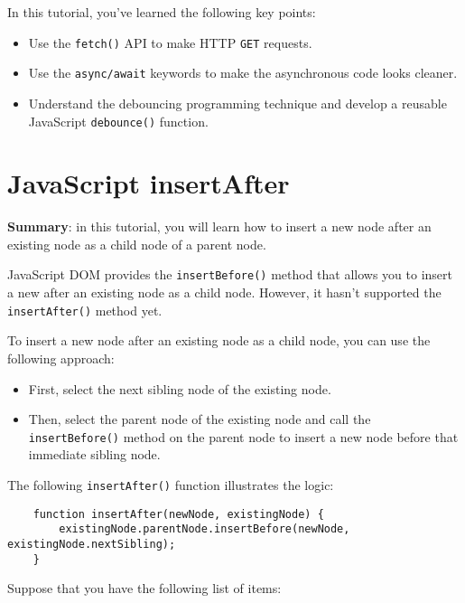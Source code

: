\documentclass[11pt]{article}
\begin{document}
In this tutorial, you've learned the following key points:

\begin{itemize}
\item Use the \verb|fetch()| API to make HTTP \verb|GET| requests.
\item Use the \verb|async/await| keywords to make the asynchronous code
looks cleaner.
\item Understand the debouncing programming technique and develop a
reusable JavaScript \verb|debounce()| function.
\end{itemize}

\section*{\huge JavaScript insertAfter}

\begin{displayquote}
\textbf{Summary}: in this tutorial, you will learn how to insert a
new node after an existing node as a child node of a parent node.
\end{displayquote}

\noindent
JavaScript DOM provides the \verb|insertBefore()| method that allows
you to insert a new after an existing node as a child node.
However, it hasn't supported the \verb|insertAfter()| method yet.
\newline

\noindent
To insert a new node after an existing node as a child node,
you can use the following approach:

\begin{itemize}
\item First, select the next sibling node of the existing node.
\item Then, select the parent node of the existing node and call
the \verb|insertBefore()| method on the parent node to insert a new node
before that immediate sibling node.
\end{itemize}

\noindent
The following \verb|insertAfter()| function illustrates the logic:

\begin{lstlisting}
    function insertAfter(newNode, existingNode) {
        existingNode.parentNode.insertBefore(newNode, existingNode.nextSibling);
    }
\end{lstlisting}

\noindent
Suppose that you have the following list of items:
\end{document}
